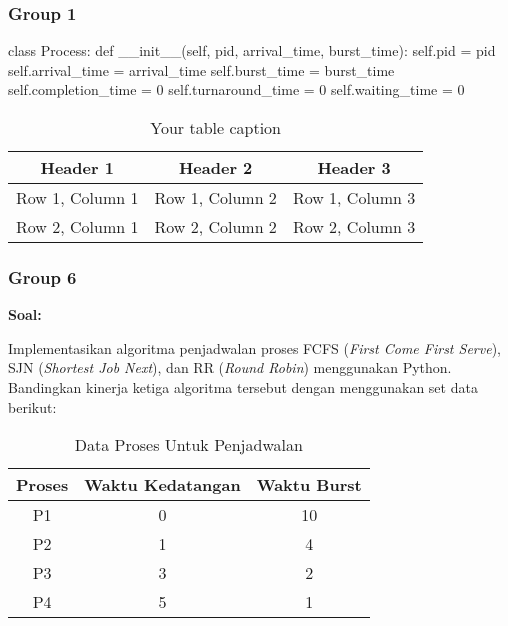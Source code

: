 \documentclass[12pt]{article}
\begin{document}
\subsubsection{Group 1}
\begin{python}
    class Process:
    def __init__(self, pid, arrival_time, burst_time):
        self.pid = pid
        self.arrival_time = arrival_time
        self.burst_time = burst_time
        self.completion_time = 0
        self.turnaround_time = 0
        self.waiting_time = 0
\end{python}

\begin{table}[htbp] %
    \centering
    \begin{tabular}{|c|c|c|} %
    \hline
    Header 1 & Header 2 & Header 3 \\ %
    \hline
    Row 1, Column 1 & Row 1, Column 2 & Row 1, Column 3 \\ %
    \hline
    Row 2, Column 1 & Row 2, Column 2 & Row 2, Column 3 \\ %
    \hline
    \end{tabular}
    \caption{Your table caption} %
    \label{tab:your_label} %
\end{table}

\subsubsection{Group 6}
\textbf{Soal:}

Implementasikan algoritma penjadwalan proses FCFS (\textit{First Come First Serve}), SJN (\textit{Shortest Job Next}), dan RR (\textit{Round Robin}) menggunakan Python. Bandingkan kinerja ketiga algoritma tersebut dengan menggunakan set data berikut:
    \begin{table}[h] %
        \centering
        \begin{tabular}{|c|c|c|} %
        \hline
        Proses & Waktu Kedatangan & Waktu Burst \\ %
        \hline
        P1 & 0 & 10 \\ %
        \hline
        P2 & 1 & 4 \\ %
        \hline
        P3 & 3 & 2 \\
        \hline
        P4 & 5 & 1 \\
        \hline
        \end{tabular}
        \caption{Data Proses Untuk Penjadwalan} %
        \label{tab:Data Proses Untuk Penjadwalan} %
    \end{table}
\end{document}

